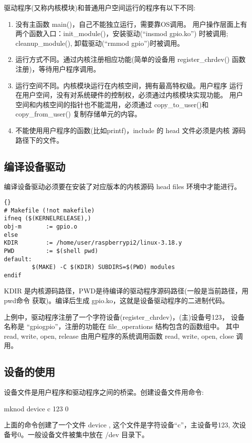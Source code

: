 \documentclass[nofonts]{ctexart}
\begin{document}
驱动程序(又称内核模块)和普通用户空间运行的程序有以下不同:
\begin{enumerate}
  \item 没有主函数 main()，自己不能独立运行，需要靠OS调用。
	用户操作层面上有两个函数入口：init\_module()，安装驱动(``insmod gpio.ko'')
	时被调用; cleanup\_module(), 卸载驱动(``rmmod gpio'')时被调用。
  \item 运行方式不同。通过内核注册相应功能(简单的设备用 register\_chrdev()
	函数注册)，等待用户程序调用。
  \item 运行空间不同。内核模块运行在内核空间，拥有最高特权级。用户程序
  运行在用户空间，没有对系统硬件的控制权，必须通过内核模块实现功能。
  用户空间和内核空间的指针也不能混用，必须通过 copy\_to\_user()和
  copy\_from\_user() 复制存储单元的内容。
  \item 不能使用用户程序的函数(比如printf)，include 的 head 文件必须是内核
  源码路径下的文件。
\end{enumerate}

\subsection{编译设备驱动}
编译设备驱动必须要在安装了对应版本的内核源码 head files 环境中才能进行。

\lstset{language=make}
\begin{lstlisting}{}
# Makefile (!not makefile)
ifneq ($(KERNELRELEASE),)
obj-m       := gpio.o
else
KDIR        := /home/user/raspberrypi2/linux-3.18.y
PWD         := $(shell pwd)
default:
        $(MAKE) -C $(KDIR) SUBDIRS=$(PWD) modules
endif
\end{lstlisting}

KDIR 是内核源码路径，PWD是待编译的驱动程序源码路径(一般是当前路径，用pwd命令
获取)。编译后生成 gpio.ko，这就是设备驱动程序的二进制代码。

上例中，驱动程序注册了一个字符设备(register\_chrdev)，(主)设备号123，
设备名称是 ``gpiogpio''，注册的功能在 file\_operations 结构包含的函数组中。
其中 read, write, open, release 由用户程序的系统调用函数 read, write, open,
close 调用。

\subsection{设备的使用}

设备文件是用户程序和驱动程序之间的桥梁。创建设备文件用命令:

mknod device c 123 0

上面的命令创建了一个文件 device , 这个文件是字符设备``c''，主设备号123,
次设备号0。一般设备文件被集中放在 /dev 目录下。
\end{document}

